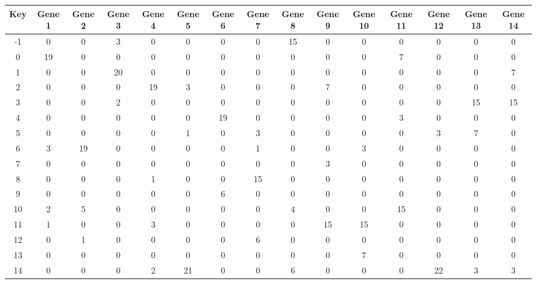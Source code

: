 \begin{tabular}{|c|c|c|c|c|c|c|c|c|c|c|c|c|c|c|}
\hline
Key & Gene 1 & Gene 2 & Gene 3 & Gene 4 & Gene 5 & Gene 6 & Gene 7 & Gene 8 & Gene 9 & Gene 10 & Gene 11 & Gene 12 & Gene 13 & Gene 14 \\
\hline
-1 & 0 & 0 & 3 & 0 & 0 & 0 & 0 & 15 & 0 & 0 & 0 & 0 & 0 & 0 \\
0 & 19 & 0 & 0 & 0 & 0 & 0 & 0 & 0 & 0 & 0 & 7 & 0 & 0 & 0 \\
1 & 0 & 0 & 20 & 0 & 0 & 0 & 0 & 0 & 0 & 0 & 0 & 0 & 0 & 7 \\
2 & 0 & 0 & 0 & 19 & 3 & 0 & 0 & 0 & 7 & 0 & 0 & 0 & 0 & 0 \\
3 & 0 & 0 & 2 & 0 & 0 & 0 & 0 & 0 & 0 & 0 & 0 & 0 & 15 & 15 \\
4 & 0 & 0 & 0 & 0 & 0 & 19 & 0 & 0 & 0 & 0 & 3 & 0 & 0 & 0 \\
5 & 0 & 0 & 0 & 0 & 1 & 0 & 3 & 0 & 0 & 0 & 0 & 3 & 7 & 0 \\
6 & 3 & 19 & 0 & 0 & 0 & 0 & 1 & 0 & 0 & 3 & 0 & 0 & 0 & 0 \\
7 & 0 & 0 & 0 & 0 & 0 & 0 & 0 & 0 & 3 & 0 & 0 & 0 & 0 & 0 \\
8 & 0 & 0 & 0 & 1 & 0 & 0 & 15 & 0 & 0 & 0 & 0 & 0 & 0 & 0 \\
9 & 0 & 0 & 0 & 0 & 0 & 6 & 0 & 0 & 0 & 0 & 0 & 0 & 0 & 0 \\
10 & 2 & 5 & 0 & 0 & 0 & 0 & 0 & 4 & 0 & 0 & 15 & 0 & 0 & 0 \\
11 & 1 & 0 & 0 & 3 & 0 & 0 & 0 & 0 & 15 & 15 & 0 & 0 & 0 & 0 \\
12 & 0 & 1 & 0 & 0 & 0 & 0 & 6 & 0 & 0 & 0 & 0 & 0 & 0 & 0 \\
13 & 0 & 0 & 0 & 0 & 0 & 0 & 0 & 0 & 0 & 7 & 0 & 0 & 0 & 0 \\
14 & 0 & 0 & 0 & 2 & 21 & 0 & 0 & 6 & 0 & 0 & 0 & 22 & 3 & 3 \\
\hline
\end{tabular}